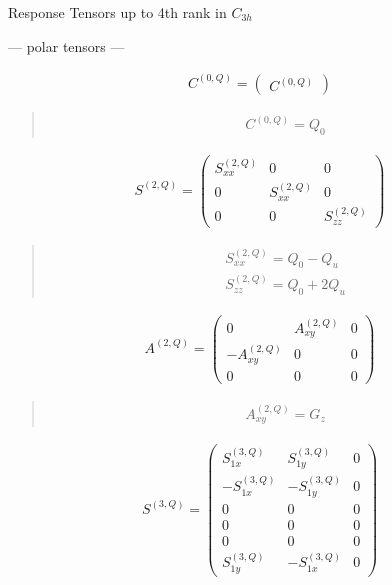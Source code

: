 \documentclass[fleqn,10pt]{jsarticle}
\begin{document}
\setcounter{MaxMatrixCols}{16}

\begin{center}
\LARGE
Response Tensors up to 4th rank in $C_{3h}$
\end{center}
\begin{center}\LARGE --- polar tensors ---\end{center}
\begin{align*}
C^{(0,Q)} = \begin{pmatrix} C^{(0,Q)} \end{pmatrix}
\end{align*}
\begin{quote}
\begin{align*}
& C^{(0,Q)} = Q_{0}
\end{align*}
\end{quote}
\begin{align*}
S^{(2,Q)} = \begin{pmatrix} S^{(2,Q)}_{xx} & 0 & 0 \\ 0 & S^{(2,Q)}_{xx} & 0 \\ 0 & 0 & S^{(2,Q)}_{zz} \end{pmatrix}
\end{align*}
\begin{quote}
\begin{align*}
& S^{(2,Q)}_{xx} = Q_{0} - Q_{u} \\
& S^{(2,Q)}_{zz} = Q_{0} + 2 Q_{u}
\end{align*}
\end{quote}
\begin{align*}
A^{(2,Q)} = \begin{pmatrix} 0 & A^{(2,Q)}_{xy} & 0 \\ - A^{(2,Q)}_{xy} & 0 & 0 \\ 0 & 0 & 0 \end{pmatrix}
\end{align*}
\begin{quote}
\begin{align*}
& A^{(2,Q)}_{xy} = G_{z}
\end{align*}
\end{quote}
\begin{align*}
S^{(3,Q)} = \begin{pmatrix} S^{(3,Q)}_{1x} & S^{(3,Q)}_{1y} & 0 \\ - S^{(3,Q)}_{1x} & - S^{(3,Q)}_{1y} & 0 \\ 0 & 0 & 0 \\ 0 & 0 & 0 \\ 0 & 0 & 0 \\ S^{(3,Q)}_{1y} & - S^{(3,Q)}_{1x} & 0 \end{pmatrix}
\end{align*}
\end{document}
